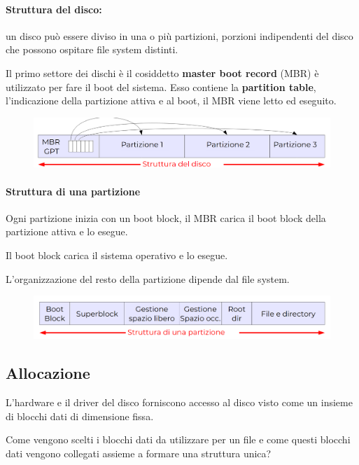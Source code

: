 \paragraph{Struttura del disco:} un disco può essere diviso in una o più partizioni, porzioni indipendenti del disco che possono ospitare file system distinti.

Il primo settore dei dischi è il cosiddetto \textbf{master boot record} (MBR) è utilizzato per fare il boot del sistema.
Esso contiene la \textbf{partition table}, l'indicazione della partizione attiva e al boot, il MBR viene letto ed eseguito.
\begin{figure} [h]
    \centering
    \includegraphics[width=0.7\linewidth]{Images/Screenshot 2025-01-18 at 16-10-24 so-07-filesystem.pdf.png}
\end{figure}

\paragraph{Struttura di una partizione}
Ogni partizione inizia con un boot block, il MBR carica il boot block della partizione attiva e lo esegue.

Il boot block carica il sistema operativo e lo esegue.

L'organizzazione del resto della partizione dipende dal file system.

\begin{figure} [h]
    \centering
    \includegraphics[width=0.7\linewidth]{Images/Screenshot 2025-01-18 at 16-12-24 so-07-filesystem.pdf.png}
\end{figure}

\newpage

\subsection{Allocazione}
L’hardware e il driver del disco forniscono accesso al disco visto
come un insieme di blocchi dati di dimensione fissa.

Come vengono scelti i blocchi dati da utilizzare per
un file e come questi blocchi dati vengono collegati assieme a
formare una struttura unica? 


